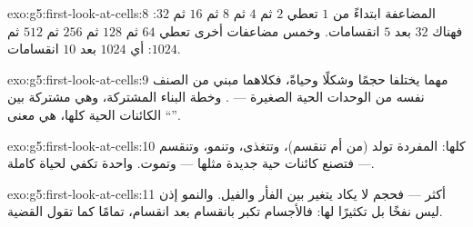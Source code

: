 \begin{solution}{exo:g5:first-look-at-cells:8}
المضاعفة ابتداءً من $1$ تعطي $2$ ثم $4$ ثم $8$ ثم $16$ ثم $32$:
فهناك $32$  بعد $5$ انقسامات. وخمس مضاعفات أخرى تعطي $64$ ثم
$128$ ثم $256$ ثم $512$ ثم $1024$: أي $1024$  بعد
$10$ انقسامات.
\end{solution}

\begin{solution}{exo:g5:first-look-at-cells:9}
مهما يختلفا حجمًا وشكلًا وحياةً، فكلاهما مبني من الصنف نفسه من
الوحدات الحية الصغيرة --- . وخطة البناء المشتركة، وهي
مشتركة بين الكائنات الحية كلها، هي معنى ``''.
\end{solution}

\begin{solution}{exo:g5:first-look-at-cells:10}
كلها:  المفردة تولد (من  أم تنقسم)، وتتغذى، وتنمو،
وتنقسم --- فتصنع كائنات حية جديدة مثلها --- وتموت.  واحدة
تكفي لحياة كاملة.
\end{solution}

\begin{solution}{exo:g5:first-look-at-cells:11}
 أكثر --- فحجم  لا يكاد يتغير بين الفأر والفيل. والنمو
إذن ليس نفخًا  بل تكثيرًا لها: فالأجسام تكبر بانقسام بعد
انقسام، تمامًا كما تقول القضية.
\end{solution}
